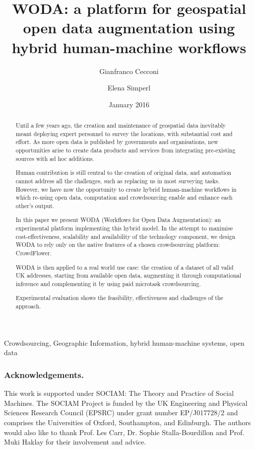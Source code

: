 \documentclass{llncs}
\title{WODA: a platform for geospatial open data augmentation using hybrid human-machine workflows}
\author{Gianfranco Cecconi\inst{1} \and Elena Simperl\inst{1}}
\institute{University of Southampton \email{gc1a13@soton.ac.uk}}
\date{January 2016}
\begin{document}
\maketitle

\begin{abstract}
Until a few years ago, the creation and maintenance of geospatial data inevitably meant deploying expert personnel to survey the locations, with substantial cost and effort. As more open data is published by governments and organisations, new opportunities arise to create data products and services from integrating pre-existing sources with ad hoc additions.

Human contribution is still central to the creation of original data, and automation cannot address all the challenges, such as replacing us in most surveying tasks. However, we have now the opportunity to create hybrid human-machine workflows in which re-using open data, computation and crowdsourcing enable and enhance each other's output. 

In this paper we present WODA (Workflows for Open Data Augmentation): an experimental platform implementing this hybrid model. In the attempt to maximise cost-effectiveness, scalability and availability of the technology component, we design WODA to rely only on the native features of a chosen crowdsourcing platform: CrowdFlower. 

WODA is then applied to a real world use case: the creation of a dataset of all valid UK addresses, starting from available open data, augmenting it through computational inference and complementing it by using paid microtask crowdsourcing. 

Experimental evaluation shows the feasibility, effectiveness and challenges of the approach.
\end{abstract}

\begin{keywords}
Crowdsourcing, Geographic Information, hybrid human-machine systems, open data 
\end{keywords}









\subsubsection{Acknowledgements.} This work is supported under SOCIAM: The Theory and Practice of Social Machines. The SOCIAM Project is funded by the UK Engineering and Physical Sciences Research Council (EPSRC) under grant number EP/J017728/2 and comprises the Universities of Oxford, Southampton, and Edinburgh. The authors would also like to thank Prof. Les Carr, Dr. Sophie Stalla-Bourdillon and Prof. Muki Haklay for their involvement and advice. 


\end{document}
